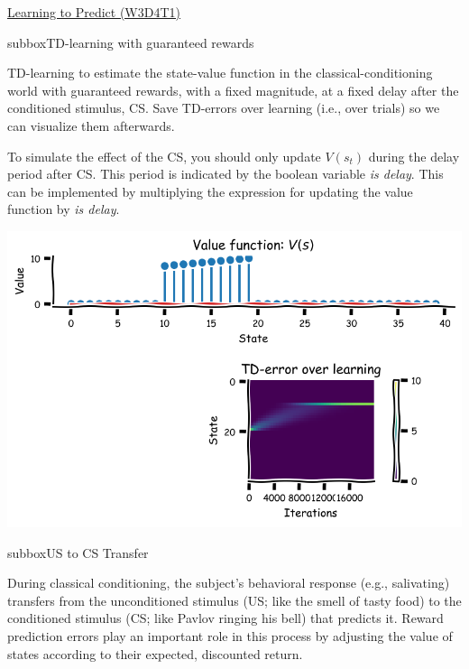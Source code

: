 \begin{textbox}{\href{https://compneuro.neuromatch.io/tutorials/W3D4_ReinforcementLearning/student/W3D4_Tutorial1.html}{Learning to Predict (W3D4T1)} }
\begin{subbox}{subbox}{TD-learning with guaranteed rewards}
\scriptsize

TD-learning to estimate the state-value function in the classical-conditioning world with guaranteed rewards, with a fixed magnitude, at a fixed delay after the conditioned stimulus, CS. Save TD-errors over learning (i.e., over trials) so we can visualize them afterwards. 

To simulate the effect of the CS, you should only update $V(s_{t})$ during the delay period after CS. This period is indicated by the boolean variable \textit{is delay}. This can be implemented by multiplying the expression for updating the value function by \textit{is delay}.

\begin{center}
    
\includegraphics[scale=0.18]{Figures/RL/RL_Figure1.png}
\end{center}

\end{subbox}
\begin{subbox}{subbox}{US to CS Transfer }
\scriptsize

During classical conditioning, the subject's behavioral response (e.g., salivating) transfers from the unconditioned stimulus (US; like the smell of tasty food) to the conditioned stimulus (CS; like Pavlov ringing his bell) that predicts it. Reward prediction errors play an important role in this process by adjusting the value of states according to their expected, discounted return.


\end{subbox}
\end{textbox}
